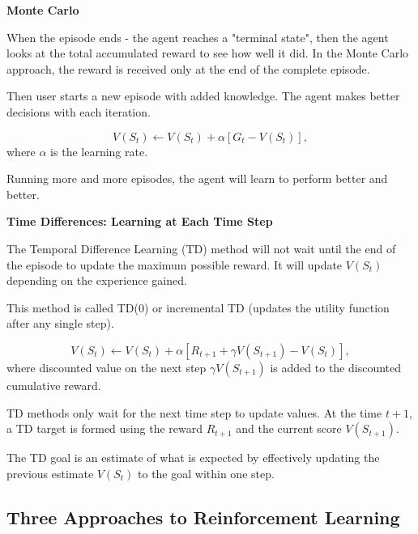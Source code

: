 \documentclass{article}
\numberwithin{equation}{subsection}
\begin{document}
\textbf{Monte Carlo}

When the episode ends - the agent reaches a "terminal state", then the agent looks at the total accumulated reward to see how well it did. In the Monte Carlo approach, the reward is received only at the end of the complete episode.

Then user starts a new episode with added knowledge. The agent makes better decisions with each iteration.

\begin{equation}
V\left(S_t\right) \leftarrow V\left(S_t\right)+\alpha\left[G_t-{V\left(S_t\right)}\right],
\end{equation}
where $\alpha$ is the learning rate.


Running more and more episodes, the agent will learn to perform better and better.

\textbf{Time Differences: Learning at Each Time Step}

The Temporal Difference Learning (TD) method will not wait until the end of the episode to update the maximum possible reward. It will update $V(S_t)$ depending on the experience gained.

This method is called TD(0) or incremental TD (updates the utility function after any single step).


\begin{equation}
	V\left(S_t\right) \leftarrow V\left(S_t\right)+\alpha\left[R_{t+1}+\gamma V\left(S_{t+1}\right)-V\left(S_t\right)\right],
\end{equation}
where discounted value on the next step $\gamma V(S_{t+1})$ is added to the discounted cumulative reward.

TD methods only wait for the next time step to update values. At the time $t+1$, a TD target is formed using the reward $R_{t+1}$ and the current score $V(S_{t+1})$.

The TD goal is an estimate of what is expected by effectively updating the previous estimate $V(S_t)$ to the goal within one step.

\subsection{Three Approaches to Reinforcement Learning}
\end{document}
